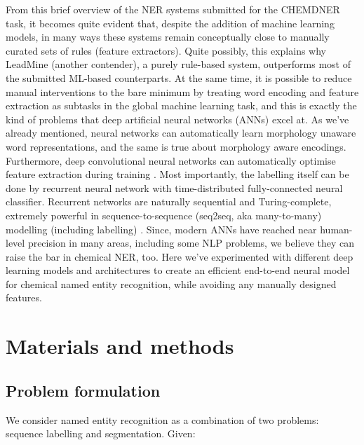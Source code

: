 \documentclass[twocolumn]{bmcart}%
\begin{document}
From this brief overview of the NER systems submitted for the CHEMDNER task, it becomes quite evident that, despite the addition of machine learning models, in many ways these systems remain conceptually close to manually curated sets of rules (feature extractors).
Quite possibly, this explains why LeadMine \cite{Lowe2015} (another contender), a purely rule-based system, outperforms most of the submitted ML-based counterparts.
At the same time, it is possible to reduce manual interventions to the bare minimum by treating word encoding and feature extraction as subtasks in the global machine learning task, and this is exactly the kind of problems that deep artificial neural networks (ANNs) excel at.
As we've already mentioned, neural networks can automatically learn morphology unaware word representations, and the same is true about morphology aware encodings.
Furthermore, deep convolutional neural networks can automatically optimise feature extraction during training \cite{Lopez2017}.
Most importantly, the labelling itself can be done by recurrent neural network with time-distributed fully-connected neural classifier.
Recurrent networks are naturally sequential and Turing-complete, extremely powerful in sequence-to-sequence (seq2seq, aka many-to-many) modelling (including labelling) \cite{Sutskever2014}.
Since, modern ANNs have reached near human-level precision in many areas, including some NLP problems, we believe they can raise the bar in chemical NER, too.
Here we've experimented with different deep learning models and architectures to create an efficient end-to-end neural model for chemical named entity recognition, while avoiding any manually designed features. 

\section*{Materials and methods}

\subsection*{Problem formulation}

We consider named entity recognition as a combination of two problems: sequence labelling and segmentation.
Given:
\end{document}
